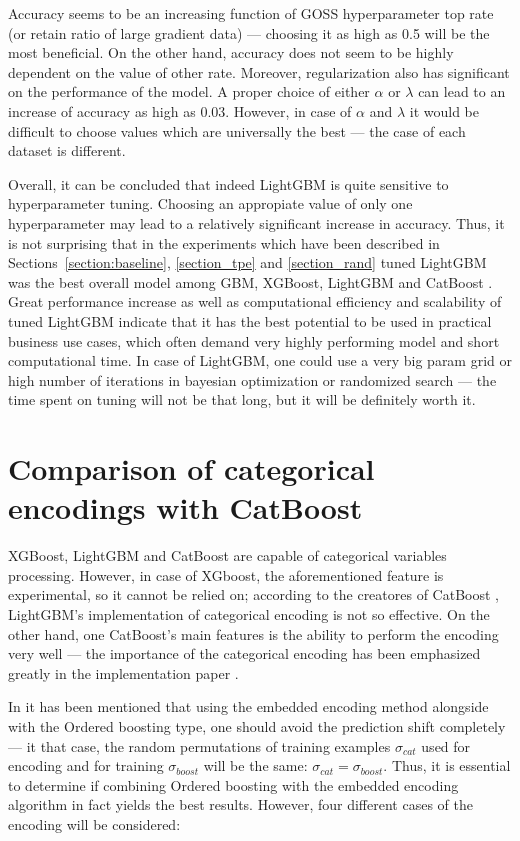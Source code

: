 \documentclass[magisterska, english]{pwr_wmat_praca_dyplomowa}
\theoremstyle{plain}
\numberwithin{theorem}{chapter}
\theoremstyle{definition}
\numberwithin{theorem}{chapter}
\newcommand{\gbm}{GBM, XGBoost, LightGBM and CatBoost }
\begin{document}
Accuracy seems to be an increasing function of GOSS hyperparameter top rate (or retain ratio of large gradient data) --- choosing it as high as 0.5 will be the most beneficial. On the other hand, accuracy does not seem to be highly dependent on the value of other rate. Moreover, regularization also has significant on the performance of the model. A proper choice of either $\alpha$ or $\lambda$ can lead to an increase of accuracy as high as 0.03. However, in case of $\alpha$ and $\lambda$ it would be difficult to choose values which are universally the best --- the case of each dataset is different.

Overall, it can be concluded that indeed LightGBM is quite sensitive to hyperparameter tuning. Choosing an appropiate value of only one hyperparameter may lead to a relatively significant increase in accuracy. Thus, it is not surprising that in the experiments which have been described in Sections~\ref{section:baseline}, \ref{section_tpe} and \ref{section_rand} tuned LightGBM was the best overall model among \gbm. Great performance increase as well as computational efficiency and scalability of tuned LightGBM indicate that it has the best potential to be used in practical business use cases, which often demand very highly performing model and short computational time. In case of LightGBM, one could use a very big param grid or high number of iterations in bayesian optimization or randomized search --- the time spent on tuning will not be that long, but it will be definitely worth it.

\section{Comparison of categorical encodings with CatBoost}
XGBoost, LightGBM and CatBoost are capable of categorical variables processing. However, in case of XGboost, the aforementioned feature is experimental, so it cannot be relied on; according to the creatores of CatBoost \cite{catboost}, LightGBM's implementation of categorical encoding is not so effective. On the other hand, one CatBoost's main features is the ability to perform the encoding very well --- the importance of the categorical encoding has been emphasized greatly in the implementation paper \cite{catboost}. 

In \cite{catboost} it has been mentioned that using the embedded encoding method alongside with the Ordered boosting type, one should avoid the prediction shift completely --- it that case, the random permutations of training examples $\sigma_{cat}$ used for encoding and for training $\sigma_{boost}$ will be the same: $\sigma_{cat} = \sigma_{boost}$. Thus, it is essential to determine if combining Ordered boosting with the embedded encoding algorithm in fact yields the best results. However, four different cases of the encoding will be considered:
\end{document}
